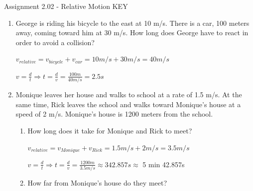 \documentclass[letterpaper, 12pt]{article}
\begin{document}


\begin{center} Assignment 2.02 - Relative Motion KEY
\end{center}





\begin{enumerate}
\item George is riding his bicycle to the east at 10 m/s.  There is a car, 100 meters away, coming toward him at 30 m/s.  How long does George have to react in order to avoid a collision?
\color{red}
\begin{center} $ v_{relative} = v_{bicycle} + v_{car} = 10 m/s + 30 m/s = 40 m/s $
	\vspace{0.15in}
	
$	v = \frac{d}{t} \Longrightarrow t = \frac{d}{v} = \frac{100m}{40 m/s} = 2.5 s $
		
\end{center}


\color{black}

\item Monique leaves her house and walks to school at a rate of 1.5 m/s.  At the same time, Rick leaves the school and walks toward Monique's house at a speed of 2 m/s.  Monique's house is 1200 meters from the school.
\begin{enumerate} \item How long does it take for Monique and Rick to meet?

	\color{red}
	\begin{center} $ v_{relative} = v_{Monique} + v_{Rick} = 1.5 m/s + 2 m/s = 3.5 m/s $
		
		\vspace{0.15in}
		$	v = \frac{d}{t} \Longrightarrow t = \frac{d}{v} = \frac{1200m}{3.5 m/s} \approx 342.857s \approx $  5 min 42.857s
		
	\end{center}
	

	\color{black}
	
	\item How far from Monique's house do they meet?
	

\end{enumerate}
\end{enumerate}
\end{document}
